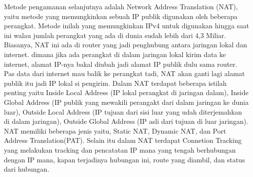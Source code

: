Metode pengamanan selanjutnya adalah Network Address Translation (NAT), yaitu metode yang memungkinkan sebuah IP publik digunakan oleh beberapa perangkat. Metode inilah yang memungkinkan IPv4 untuk digunakan hingga saat ini walau jumlah perangkat yang ada di dunia sudah lebih dari 4,3 Miliar. Biasanya, NAT ini ada di router yang jadi penghubung antara jaringan lokal dan internet. dimana jika ada perangkat di dalam jaringan lokal kirim data ke internet, alamat IP-nya bakal diubah jadi alamat IP publik dulu sama router. Pas data dari internet mau balik ke perangkat tadi, NAT akan ganti lagi alamat publik itu jadi IP lokal si pengirim. Dalam NAT terdapat beberapa istilah penting yaitu Inside Local Address (IP lokal perangkat di jaringan dalam), Inside Global Address (IP publik yang mewakili perangakt dari dalam jaringan ke dunia luar), Outside Local Address (IP tujuan dari sisi luar yang udah diterjemahkan di dalam jaringan), Outside Global Address (IP asli dari tujuan di luar jaringan). NAT memiliki beberapa jenis yaitu, Static NAT, Dynamic NAT, dan Port Address Translation(PAT). Selain itu dalam NAT terdapat Connetion Tracking yang melakukan tracking dan pencatatan IP mana yang tengah berhubungan dengan IP mana, kapan terjadinya hubungan ini, route yang diambil, dan status dari hubungan. 

